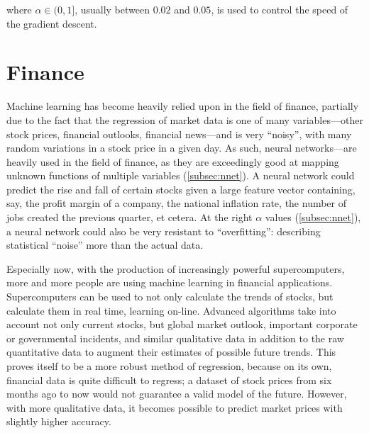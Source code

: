 \documentclass[a4paper]{comjnl}
\numberwithin{equation}{subsection}
\begin{document}
            \noindent where $\alpha \in (0,1]$, usually between $0.02$ and $0.05$, is used to
            control the speed of the gradient descent.


    \section{Finance}

        Machine learning has become heavily relied upon in the field of finance, partially due to
        the fact that the regression of market data is one of many variables---other stock prices,
        financial outlooks, financial news---and is very ``noisy'', with many random variations in
        a stock price in a given day. As such, neural networks---are heavily used in the field of
        finance, as they are exceedingly good at mapping unknown functions of multiple variables
        (\ref{subsec:nnet}). A neural network could predict the rise and fall of certain stocks
        given a large feature vector containing, say, the profit margin of a company, the national
        inflation rate, the number of jobs created the previous quarter, et cetera. At the right
        $\alpha$ values (\ref{subsec:nnet}), a neural network could also be very resistant to
        ``overfitting'': describing statistical ``noise'' more than the actual data.

        Especially now, with the production of increasingly powerful supercomputers, more and more
        people are using machine learning in financial applications.  Supercomputers can be used to
        not only calculate the trends of stocks, but calculate them in real time, learning on-line.
        Advanced algorithms take into account not only current stocks, but global market outlook,
        important corporate or governmental incidents, and similar qualitative data in addition to
        the raw quantitative data to augment their estimates of possible future trends. This
        proves itself to be a more robust method of regression, because on its own, financial
        data is quite difficult to regress; a dataset of stock prices from six months ago to now
        would not guarantee a valid model of the future. However, with more qualitative data, it
        becomes possible to predict market prices with slightly higher accuracy.
\end{document}
